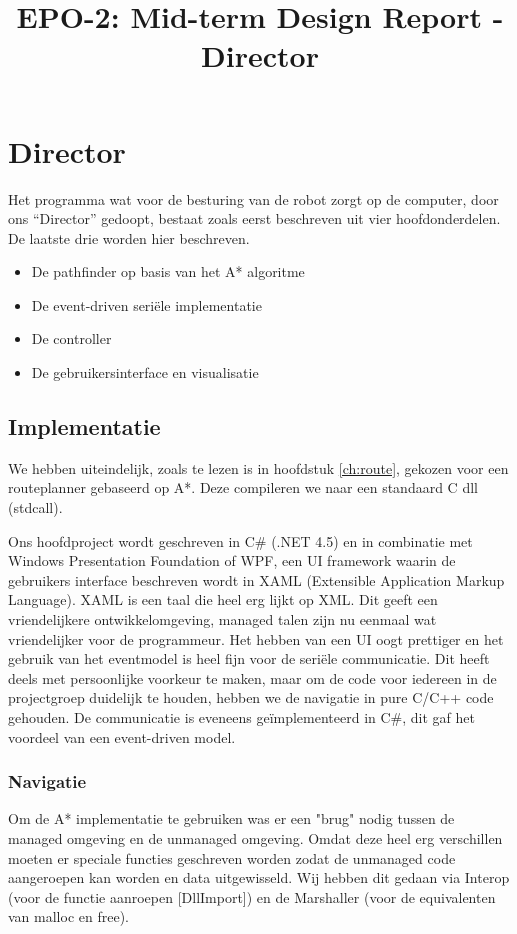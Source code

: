 \documentclass{report}
\title{EPO-2: Mid-term Design Report - Director}
\author{}
\begin{document}
\chapter{Director}
\label{ch:director}
Het programma wat voor de besturing van de robot zorgt op de computer, door ons ``Director'' gedoopt, bestaat zoals eerst beschreven uit vier hoofdonderdelen. De laatste drie worden hier beschreven.
\begin{itemize}
\item De pathfinder op basis van het A* algoritme
\item De event-driven seriële implementatie
\item De controller
\item De gebruikersinterface en visualisatie
\end{itemize}
\section{Implementatie}
\label{sec:dirImplementatie}
We hebben uiteindelijk, zoals te lezen is in hoofdstuk \ref{ch:route}, gekozen voor een routeplanner gebaseerd op A*. Deze compileren we naar een standaard C dll (stdcall).

Ons hoofdproject wordt geschreven in C\# (.NET 4.5) en in combinatie met Windows Presentation Foundation of WPF, een UI framework waarin de gebruikers interface beschreven wordt in XAML (Extensible Application Markup Language).
XAML is een taal die heel erg lijkt op XML.
Dit geeft een vriendelijkere ontwikkelomgeving, managed talen zijn nu eenmaal wat vriendelijker voor de programmeur.
Het hebben van een UI oogt prettiger en het gebruik van het eventmodel is heel fijn voor de seriële communicatie.
Dit heeft deels met persoonlijke voorkeur te maken, maar om de code voor iedereen in de projectgroep duidelijk te houden, hebben we de navigatie in pure C/C++ code gehouden.
De communicatie is eveneens geïmplementeerd in C\#, dit gaf het voordeel van een event-driven model.

\subsection{Navigatie}
Om de A* implementatie te gebruiken was er een "brug" nodig tussen de managed omgeving en de unmanaged omgeving.
Omdat deze heel erg verschillen moeten er speciale functies geschreven worden zodat de unmanaged code aangeroepen kan worden en data uitgewisseld.
Wij hebben dit gedaan via Interop (voor de functie aanroepen [DllImport]) en de Marshaller (voor de equivalenten van malloc en free).
\end{document}
